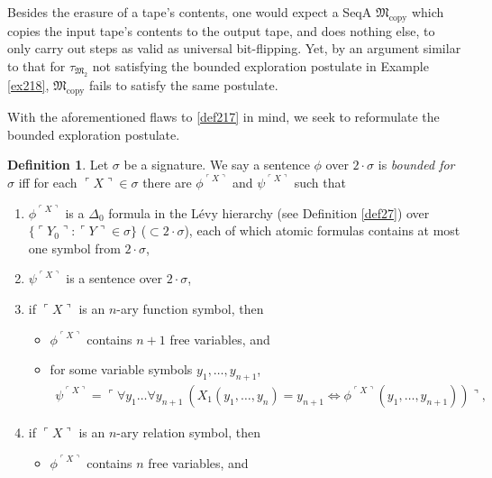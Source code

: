 \documentclass[12pt, twoside]{memoir}
\numberwithin{equation}{section}
\theoremstyle{definition}
\newtheorem{defi}[thm]{Definition}
\theoremstyle{remark}
\theoremstyle{definition}
\theoremstyle{definition}
\theoremstyle{definition}
\theoremstyle{remark}
\begin{document}
Besides the erasure of a tape's contents, one would expect a SeqA $\mathfrak{M}_{\text{copy}}$ which copies the input tape's contents to the output tape, and does nothing else, to only carry out steps as valid as universal bit-flipping. Yet, by an argument similar to that for $\tau_{\mathfrak{M}_2}$ not satisfying the bounded exploration postulate in Example \ref{ex218}, $\mathfrak{M}_{\text{copy}}$ fails to satisfy the same postulate. 

With the aforementioned flaws to \ref{def217} in mind, we seek to reformulate the bounded exploration postulate.

\begin{defi}\label{def220}
Let $\sigma$ be a signature. We say a sentence $\phi$ over $2 \cdot \sigma$ is \emph{bounded for} $\sigma$ iff for each $\ulcorner X \urcorner \in \sigma$ there are $\phi^{\ulcorner X \urcorner}$ and $\psi^{\ulcorner X \urcorner}$ such that
\begin{enumerate}[label=(\alph*)]
    \item\label{82161} $\phi^{\ulcorner X \urcorner}$ is a $\Delta_0$ formula in the L\'{e}vy hierarchy (see Definition \ref{def27}) over $\{\ulcorner Y_0 \urcorner : \ulcorner Y \urcorner \in \sigma\}$ ($\subset 2 \cdot \sigma$), each of which atomic formulas contains at most one symbol from $2 \cdot \sigma$,
    \item $\psi^{\ulcorner X \urcorner}$ is a sentence over $2 \cdot \sigma$,
    \item\label{82163} if $\ulcorner X \urcorner$ is an $n$-ary function symbol, then 
    \begin{itemize}[label=$\circ$, leftmargin=20pt]
        \item $\phi^{\ulcorner X \urcorner}$ contains $n + 1$ free variables, and
        \item for some variable symbols $y_1, \dots, y_{n+1}$,
        \begin{align*}
            \psi^{\ulcorner X \urcorner} = \ulcorner \forall y_1 \dots \forall y_{n+1} \ (X_1(y_1, \dots, y_n) = y_{n+1} \iff \phi^{\ulcorner X \urcorner}(y_1, \dots, y_{n+1})) \urcorner \text{,}
        \end{align*}
    \end{itemize}
    \item if $\ulcorner X \urcorner$ is an $n$-ary relation symbol, then 
    \begin{itemize}[label=$\circ$, leftmargin=20pt]
        \item $\phi^{\ulcorner X \urcorner}$ contains $n$ free variables, and

\end{itemize}
\end{enumerate}
\end{defi}
\end{document}
